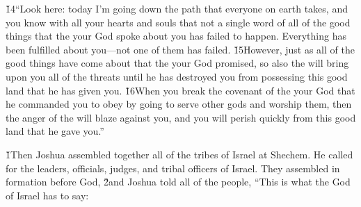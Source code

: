 \v{14}``Look here: today I'm going down the path that everyone on earth takes, and you know with all your hearts and souls that not a single word of all of the good things that the  your God spoke about you has failed to happen. Everything has been fulfilled about you---not one of them has failed. \v{15}However, just as all of the good things have come about that the  your God promised, so also the  will bring upon you all of the threats until he has destroyed you from possessing this good land that he has given you. \v{16}When you break the covenant of the  your God that he commanded you to obey by going to serve other gods and worship them, then the anger of the  will blaze against you, and you will perish quickly from this good land that he gave you.''

\v{1}Then Joshua assembled together all of the tribes of Israel at Shechem. He called for the leaders, officials, judges, and tribal officers of Israel. They assembled in formation before God, \v{2}and Joshua told all of the people, ``This is what the  God of Israel has to say:

